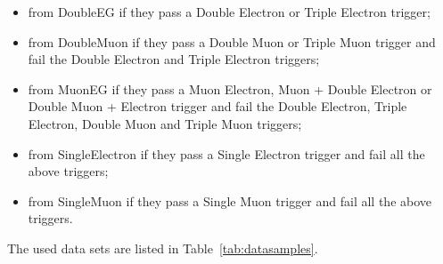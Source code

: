 \begin{itemize}
\item from DoubleEG if they pass a Double Electron %
  or Triple Electron trigger; %
\item from DoubleMuon if they pass a Double Muon %
  or Triple Muon trigger %
  and fail the Double Electron and Triple Electron triggers;
\item from MuonEG if they pass a Muon Electron, %
  Muon + Double Electron %
  or Double Muon + Electron trigger %
  and fail the Double Electron, Triple Electron, Double Muon and Triple Muon triggers;
\item from SingleElectron if they pass a Single Electron trigger %
  and fail all the above triggers;
\item from SingleMuon if they pass a Single Muon trigger %
  and fail all the above triggers.
\end{itemize}

The used data sets are listed in Table~\ref{tab:datasamples}.%

